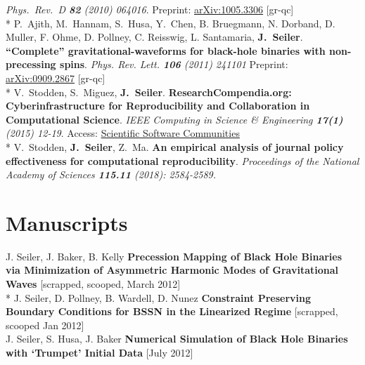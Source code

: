 \documentclass[11pt]{seilercv}
\begin{document}
{ \textit{Phys.\ Rev.\  D {\bf 82} (2010) 064016}.  Preprint: \href{http://arxiv.org/abs/1005.3306}{arXiv:1005.3306} [gr-qc]\vspace{0.2cm} \\*
{P.~Ajith, M.~Hannam, S.~Husa, Y.~Chen, B. Bruegmann, N. Dorband, D. Muller, F. Ohme, D. Pollney, C. Reisswig, L. Santamaria, {\bf J.~Seiler}.} \textbf{``Complete'' gravitational-waveforms for black-hole binaries with non-precessing spins}.  \textit{Phys. Rev. Lett. {\bf 106} (2011) 241101} Preprint: \href{http://arxiv.org/abs/0909.2867}{arXiv:0909.2867} [gr-qc]\vspace{0.2cm} \\*
{V.~Stodden, S.~Miguez, {\bf J.~Seiler}.} \textbf{ResearchCompendia.org: Cyberinfrastructure for Reproducibility and Collaboration in Computational Science}. \textit{IEEE Computing in Science \& Engineering {\bf 17(1)} (2015) 12-19}. Access: \href{http://online.qmags.com/CISE0115?pg=14&mode=2#pg14&mode2?fs=2&pg=14&mode=2}{Scientific Software Communities}\vspace{0.2cm} \\*
{V.~Stodden, {\bf J.~Seiler}, Z.~Ma. }\textbf{An empirical analysis of journal policy effectiveness for computational reproducibility}. \textit{Proceedings of the National Academy of Sciences {\bf 115.11} (2018): 2584-2589.}}%

\section{Manuscripts} 
{\small {J. Seiler, J. Baker, B. Kelly} \textbf{ Precession Mapping of Black Hole Binaries via Minimization of Asymmetric Harmonic Modes of Gravitational Waves }[scrapped, scooped, March 2012] \vspace{0.1cm}\\*
{J. Seiler, D. Pollney, B. Wardell, D. Nunez} \textbf{ Constraint Preserving Boundary Conditions for BSSN in the Linearized Regime } [scrapped, scooped Jan 2012]} \vspace{0.1cm} \\
{J. Seiler, S. Husa, J. Baker} \textbf{ Numerical Simulation of Black Hole Binaries with `Trumpet' Initial Data } [July 2012] 
\end{document}
